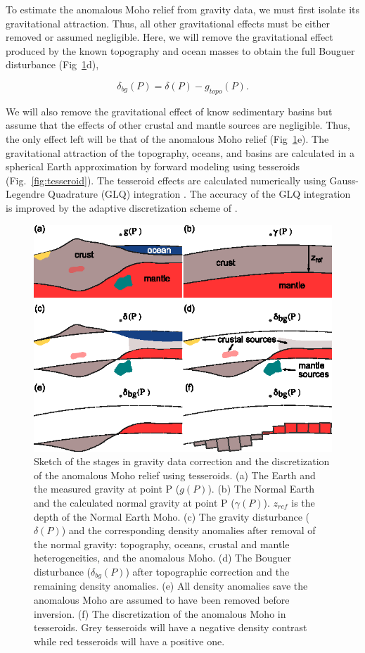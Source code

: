 \documentclass[extra,mreferee]{gji}
\begin{document}
To estimate the anomalous Moho relief from gravity data,
we must first isolate its gravitational attraction.
Thus, all other gravitational effects
must be either removed or assumed negligible.
Here, we will remove the gravitational effect produced by the known topography
and ocean masses to obtain the full Bouguer disturbance
(Fig~\ref{fig:anomalysketch}d),

\begin{equation}
    \delta_{bg}(P) = \delta(P) - g_{topo}(P).
    \label{eq:bouguer}
\end{equation}

\noindent
We will also remove the gravitational effect of know sedimentary basins
but assume that the effects of
other crustal and mantle sources are negligible.
Thus, the only effect left will be that of the anomalous Moho relief
(Fig~\ref{fig:anomalysketch}e).
The gravitational attraction of the topography, oceans, and basins are
calculated in a spherical Earth approximation by forward modeling using
tesseroids (Fig.~\ref{fig:tesseroid}).
The tesseroid effects are calculated numerically using
Gauss-Legendre Quadrature (GLQ) integration \citep{asgharzadeh2007}.
The accuracy of the GLQ integration is improved by the adaptive discretization
scheme of \citet{uieda2016}.


\begin{figure}
    \centering
    \includegraphics[width=0.5\columnwidth]{figures/problem-concept}
    \caption{
        Sketch of the stages in gravity data correction and
        the discretization of the anomalous Moho relief using tesseroids.
        (a) The Earth and the measured gravity at point P ($g(P)$).
        (b) The Normal Earth and the calculated normal gravity at point P
        ($\gamma(P)$). $z_{ref}$ is the depth of the Normal Earth Moho.
        (c) The gravity disturbance ($\delta(P)$) and the corresponding density
        anomalies after removal of the normal gravity: topography, oceans,
        crustal and mantle heterogeneities, and the anomalous Moho.
        (d) The Bouguer disturbance ($\delta_{bg}(P)$) after topographic
        correction and the remaining density anomalies.
        (e) All density anomalies save the anomalous Moho are assumed to have
        been removed before inversion.
        (f) The discretization of the anomalous Moho in tesseroids. Grey
        tesseroids will have a negative density contrast while red tesseroids
        will have a positive one.
    }
    \label{fig:anomalysketch}
\end{figure}
\end{document}
